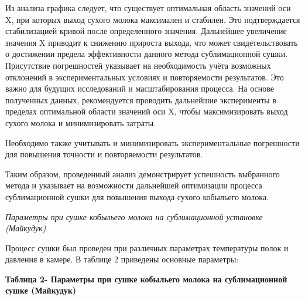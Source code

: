 Из анализа графика следует, что существует оптимальная область значений
оси X, при которых выход сухого молока максимален и стабилен. Это
подтверждается стабилизацией кривой после определенного значения.
Дальнейшее увеличение значения X приводит к снижению прироста выхода,
что может свидетельствовать о достижении предела эффективности данного
метода сублимационной сушки. Присутствие погрешностей указывает на
необходимость учёта возможных отклонений в экспериментальных условиях и
повторяемости результатов. Это важно для будущих исследований и
масштабирования процесса. На основе полученных данных, рекомендуется
проводить дальнейшие эксперименты в пределах оптимальной области
значений оси X, чтобы максимизировать выход сухого молока и
минимизировать затраты.

Необходимо также учитывать и минимизировать экспериментальные
погрешности для повышения точности и повторяемости результатов.

Таким образом, проведенный анализ демонстрирует успешность выбранного
метода и указывает на возможности дальнейшей оптимизации процесса
сублимационной сушки для повышения выхода сухого кобыльего молока.

\emph{Параметры при сушке кобыльего молока на сублимационной установке
(Майкудук)}

Процесс сушки был проведен при различных параметрах температуры полок и
давления в камере. В таблице 2 приведены основные параметры:

{\bfseries Таблица 2- Параметры при сушке кобыльего молока на
сублимационной сушке (Майкудук)}

